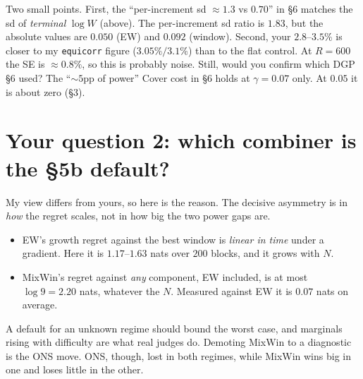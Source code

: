 \documentclass[11pt]{article}
\begin{document}
Two small points. First, the ``per-increment sd ${\approx}1.3$ vs $0.70$'' in \S6 matches the sd of \emph{terminal} $\log W$ (above). The per-increment sd ratio is $1.83$, but the absolute values are $0.050$ (EW) and $0.092$ (window). Second, your $2.8$--$3.5\%$ is closer to my \texttt{equicorr} figure ($3.05\%/3.1\%$) than to the flat control. At $R=600$ the SE is ${\approx}0.8\%$, so this is probably noise. Still, would you confirm which DGP \S6 used?
The ``${\sim}5$pp of power'' Cover cost in \S6 holds at $\gamma=0.07$ only. At $0.05$ it is about zero (\S3).

\section{Your question 2: which combiner is the \S5b default?}\label{sec:default}
My view differs from yours, so here is the reason. The decisive asymmetry is in \emph{how} the regret scales, not in how big the two power gaps are.
\begin{itemize}[nosep]
\item EW's growth regret against the best window is \emph{linear in time} under a gradient. Here it is $1.17$--$1.63$ nats over $200$ blocks, and it grows with $N$.
\item MixWin's regret against \emph{any} component, EW included, is at most $\log 9=2.20$ nats, whatever the $N$. Measured against EW it is $0.07$ nats on average.
\end{itemize}
A default for an unknown regime should bound the worst case, and marginals rising with difficulty are what real judges do. Demoting MixWin to a diagnostic is the ONS move. ONS, though, lost in both regimes, while MixWin wins big in one and loses little in the other.
\end{document}
